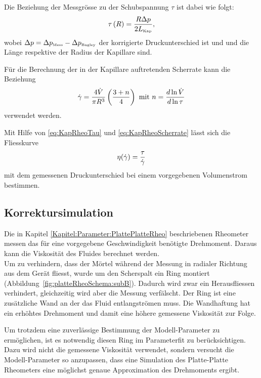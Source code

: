 Die Beziehung der Messgrösse  zu der Schubspannung $\tau$ ist dabei wie folgt:
\begin{equation}
    \label{eq:KapRheoTau}
    \tau\left( R \right) = \frac{R \Delta p}{2L_\text{\tiny Kap}},
\end{equation}
wobei $\Delta p = \Delta p_{\mbox{\tiny Mess}} -\Delta p_{\mbox{\tiny Bagley}}$ der korrigierte Druckunterschied ist und  und  die Länge respektive der Radius der Kapillare sind.

Für die Berechnung der in der Kapillare auftretenden Scherrate kann die Beziehung
\begin{equation}
    \label{eq:KapRheoScherrate}
    \dot\gamma = \frac{4 \dot{V}}{\pi R^3}\left( \frac{3+n}{4} \right) \mbox{ mit } n=\frac{d \ln \dot{V}}{d\ln\tau}
\end{equation}
verwendet werden. 

Mit Hilfe von \eqref{eq:KapRheoTau} und \eqref{eq:KapRheoScherrate} lässt sich die Fliesskurve 
\begin{equation}
    \eta(\dot\gamma) = \frac{\tau}{\dot\gamma}
\end{equation}
mit dem gemessenen Druckunterschied bei einem vorgegebenen Volumenstrom bestimmen.
%
%
\subsection{Korrektursimulation}
\label{Kapitel:Korrektursimulation}
Die in Kapitel \ref{Kapitel:Parameter:PlattePlatteRheo} beschriebenen Rheometer messen das für eine vorgegebene Geschwindigkeit benötigte Drehmoment. Daraus kann die Viskosität des Fluides berechnet werden.\\
Um zu verhindern, dass der Mörtel während der Messung in radialer Richtung aus dem Gerät fliesst, wurde um den Scherspalt ein Ring montiert (Abbildung~\ref{fig:platteRheoSchema:subB}). Dadurch wird zwar ein Herausfliessen verhindert, gleichzeitig wird aber die Messung verfälscht. Der Ring ist eine zusätzliche Wand an der das Fluid entlangströmen muss. Die Wandhaftung hat ein erhöhtes Drehmoment und damit eine höhere gemessene Viskosität zur Folge.

Um trotzdem eine zuverlässige Bestimmung der Modell-Parameter zu ermöglichen, ist es notwendig diesen Ring im Parameterfit zu berücksichtigen. Dazu wird nicht die gemessene Viskosität verwendet, sondern versucht die Modell-Parameter so anzupassen, dass eine Simulation des Platte-Platte Rheometers eine möglichst genaue Approximation des Drehmoments ergibt.

